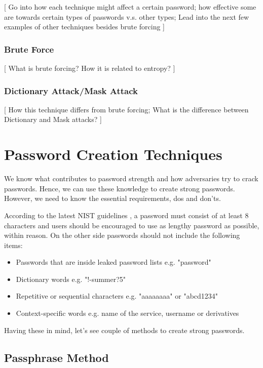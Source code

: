 \documentclass[acmsmall,nonacm]{acmart}
\begin{document}
\textcolor{beaver}{[ Go into how each technique might affect a certain password; how effective some are towards certain types of passwords v.s. other types; Lead into the next few examples of other techniques besides brute forcing ]}

\subsubsection{Brute Force}

\textcolor{beaver}{[ What is brute forcing? How it is related to entropy? ]}

\subsubsection{Dictionary Attack/Mask Attack} \label{dictionary/mask}
\textcolor{beaver}{[ How this technique differs from brute forcing; What is the difference between Dictionary and Mask attacks? ]}


\section{Password Creation Techniques} \label{creation}

We know what contributes to password strength  and how adversaries try to crack passwords. Hence, we can use these knowledge to create strong passwords. However, we need to know the essential requirements, dos and don'ts.

According to the latest NIST guidelines \cite{nist_2020}, a password must consist of at least 8 characters and users should be encouraged to use as lengthy password as possible, within reason. On the other side passwords should not include the following items:

\begin{itemize}
\item Passwords that are inside leaked password lists e.g. "password" 
\item Dictionary words e.g. "!-summer?5"
\item Repetitive or sequential characters e.g. "aaaaaaaa" or "abcd1234"
\item Context-specific words e.g. name of the service, username or derivatives
\end{itemize}

Having these in mind, let's see couple of methods to create strong passwords.

\subsection{Passphrase Method}
\end{document}
